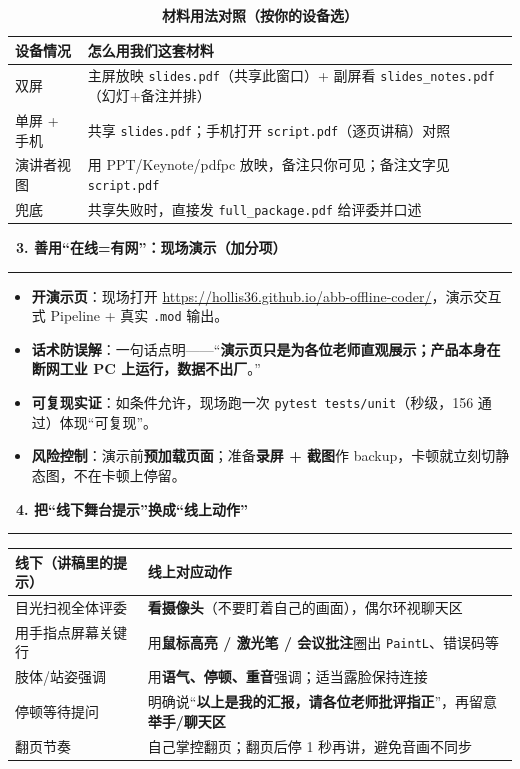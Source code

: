 \documentclass[a4paper,11pt,fontset=none]{ctexart}
\newcommand{\sect}[1]{\par\vspace{7pt}\noindent
  {\sffamily\bfseries\large\color{abbdark}\ding{110}\ #1}\\[-3pt]
  {\color{abbred}\rule{\linewidth}{0.8pt}}\par\vspace{3pt}}
\begin{document}
\begin{table}[h]
\centering\small
\caption*{\small\textbf{材料用法对照（按你的设备选）}}
\begin{tabularx}{\linewidth}{@{}l X@{}}
\toprule
\textbf{设备情况} & \textbf{怎么用我们这套材料} \\
\midrule
双屏 & 主屏放映 \texttt{slides.pdf}（共享此窗口）+ 副屏看 \texttt{slides\_notes.pdf}（幻灯+备注并排） \\
单屏 + 手机 & 共享 \texttt{slides.pdf}；手机打开 \texttt{script.pdf}（逐页讲稿）对照 \\
演讲者视图 & 用 PPT/Keynote/pdfpc 放映，备注只你可见；备注文字见 \texttt{script.pdf} \\
兜底 & 共享失败时，直接发 \texttt{full\_package.pdf} 给评委并口述 \\
\bottomrule
\end{tabularx}
\end{table}

\sect{3. 善用“在线=有网”：现场演示（加分项）}
\begin{itemize}
  \item \textbf{开演示页}：现场打开 \url{https://hollis36.github.io/abb-offline-coder/}，演示交互式 Pipeline + 真实 \texttt{.mod} 输出。
  \item \textbf{话术防误解}：一句话点明——“\textbf{演示页只是为各位老师直观展示；产品本身在断网工业 PC 上运行，数据不出厂}。”
  \item \textbf{可复现实证}：如条件允许，现场跑一次 \texttt{pytest tests/unit}（秒级，156 通过）体现“可复现”。
  \item \textbf{风险控制}：演示前\textbf{预加载页面}；准备\textbf{录屏 + 截图}作 backup，卡顿就立刻切静态图，不在卡顿上停留。
\end{itemize}

\sect{4. 把“线下舞台提示”换成“线上动作”}
\begin{table}[h]
\centering\small
\begin{tabularx}{\linewidth}{@{}X X@{}}
\toprule
\textbf{线下（讲稿里的提示）} & \textbf{线上对应动作} \\
\midrule
目光扫视全体评委 & \textbf{看摄像头}（不要盯着自己的画面），偶尔环视聊天区 \\
用手指点屏幕关键行 & 用\textbf{鼠标高亮 / 激光笔 / 会议批注}圈出 \texttt{PaintL}、错误码等 \\
肢体/站姿强调 & 用\textbf{语气、停顿、重音}强调；适当露脸保持连接 \\
停顿等待提问 & 明确说“\textbf{以上是我的汇报，请各位老师批评指正}”，再留意\textbf{举手/聊天区} \\
翻页节奏 & 自己掌控翻页；翻页后停 1 秒再讲，避免音画不同步 \\
\bottomrule
\end{tabularx}
\end{table}
\end{document}
